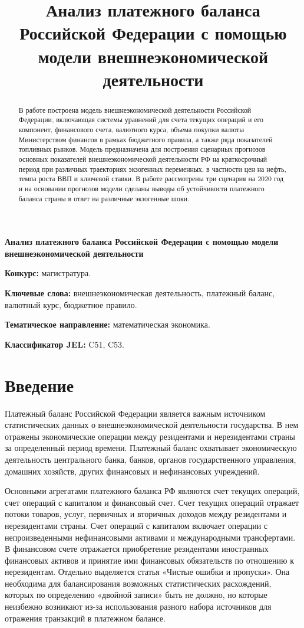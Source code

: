 \documentclass[a4paper, 14pt]{extarticle}
\title{	Анализ платежного баланса Российской Федерации с помощью модели внешнеэкономической деятельности}
\begin{document}
\begin{center}
	{\textbf{Анализ платежного баланса Российской Федерации с помощью модели внешнеэкономической деятельности
	}}
\end{center}

{\bf Конкурс:} магистратура.

{\bf Ключевые слова:} внешнеэкономическая деятельность, платежный баланс, валютный курс, бюджетное правило.

\begin{abstract}
	В работе построена модель внешнеэкономической деятельности Российской Федерации, включающая системы уравнений для счета текущих операций и его компонент, финансового счета, валютного курса, объема покупки валюты Министерством финансов в рамках бюджетного правила, а также ряда показателей топливных рынков. Модель предназначена для построения сценарных прогнозов основных показателей внешнеэкономической деятельности РФ на краткосрочный период при различных траекториях экзогенных переменных, в частности цен на нефть, темпа роста ВВП и ключевой ставки. В работе рассмотрены три сценария на $2020$ год и на основании прогнозов модели сделаны выводы об устойчивости платежного баланса страны в ответ на различные экзогенные шоки.
\end{abstract}

{\bf Тематическое направление:} математическая экономика.

{\bf Классификатор JEL:} C51, C53.

\newpage
\section{Введение}
Платежный баланс Российской Федерации является важным источником статистических данных о внешнеэкономической деятельности государства. 
В нем отражены экономические операции между резидентами и нерезидентами страны за определенный период времени. 
Платежный баланс охватывает экономическую деятельность центрального банка, банков, органов государственного управления, домашних хозяйств, других финансовых и нефинансовых учреждений.

Основными агрегатами платежного баланса РФ являются счет текущих операций, счет операций с капиталом и финансовый счет. 
Счет текущих операций отражает потоки товаров, услуг, первичных и вторичных доходов между резидентами и нерезидентами страны.  
Счет операций с капиталом включает операции с непроизведенными нефинансовыми активами и международными трансфертами. 
В финансовом счете отражается приобретение резидентами иностранных финансовых активов  и принятие ими финансовых обязательств по отношению к нерезидентам.
Отдельно выделяется статья «Чистые ошибки и пропуски».
Она необходима для балансирования возможных статистических расхождений, которых по определению «двойной записи» быть не должно, но которые неизбежно возникают из-за использования разного набора источников для отражения транзакций в платежном балансе.
\end{document}
